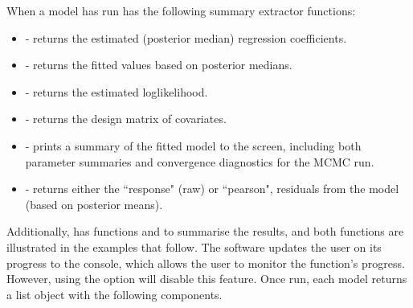 \documentclass[article,shortnames,nojss]{jss}
\begin{document}
When a model has run  has the following summary extractor functions: 


\begin{itemize}
\item {} - returns the estimated (posterior median) regression coefficients. 
\item {} - returns the fitted values based on posterior medians.
\item {} - returns the estimated loglikelihood.
\item {} - returns the design matrix of covariates.
\item {} - prints a summary of the fitted model to the screen, including both parameter summaries and convergence diagnostics for the MCMC run.
\item {} - returns either the ``response" (raw) or ``pearson", residuals from the model (based on posterior means).
\end{itemize}

Additionally,  has functions  and  to summarise the results, and both functions are illustrated in the examples that follow. The software updates the user on its progress to the  console, which allows the user to monitor the function's progress. However, using the  option will disable this feature. Once run, each model returns a list object with the following components. 
\end{document}
